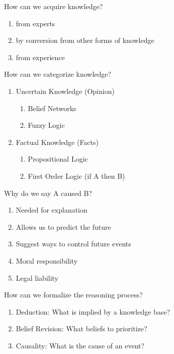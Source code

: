 \documentclass[../../lecture_notes.tex]{subfiles}
\begin{document}
\noindent How can we acquire knowledge?
	\begin{enumerate} [itemsep=0mm]
		\item from experts
		\item by conversion from other forms of knowledge
		\item from experience
	\end{enumerate}

How can we categorize knowledge?
\begin{enumerate} [itemsep=0mm]
	\item Uncertain Knowledge (Opinion)
		\begin{enumerate} [itemsep=0mm]
			\item Belief Networks
			\item Fuzzy Logic
		\end{enumerate}
	\item Factual Knowledge (Facts)
		\begin{enumerate} [itemsep=0mm]
			\item Propositional Logic
			\item First Order Logic (if A then B)
		\end{enumerate}
\end{enumerate} \medskip
        

Why do we say A caused B?
\begin{enumerate} [itemsep=0mm]
	\item Needed for explanation
	\item Allows us to predict the future
	\item Suggest ways to control future events
	\item Moral responsibility
	\item Legal liability
\end{enumerate} \medskip

How can we formalize the reasoning process?
\begin{enumerate} [itemsep=0mm]
	\item Deduction: What is implied by a knowledge base?
	\item Belief Revision: What beliefs to prioritize?
	\item Causality: What is the cause of an event?
\end{enumerate} \medskip
\end{document}
